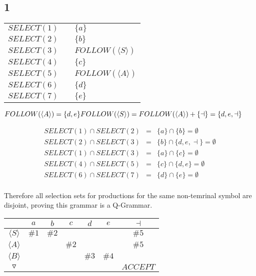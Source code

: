 \documentclass[a4paper,12pt]{article}
\newcommand{\nonterminal}[1]{\langle #1 \rangle}
\begin{document}
\subsection*{1}

\begin{tabular}{lcl}
$SELECT(1)$	&	\hspace{10mm}	&	$\{a\}$	\\
$SELECT(2)$	&						&	$\{b\}$	\\
$SELECT(3)$	&						&	$FOLLOW(\nonterminal{S})$	\\
$SELECT(4)$	&						&	$\{c\}$	\\
$SELECT(5)$	&						&	$FOLLOW(\nonterminal{A})$	\\
$SELECT(6)$	&						&	$\{d\}$	\\
$SELECT(7)$	&						&	$\{e\}$	\\
\end{tabular}

$FOLLOW(\nonterminal{A}) = \{d,e\} \\
FOLLOW(\nonterminal{S}) = FOLLOW(\nonterminal{A}) + \{\dashv\} =
\{d,e,\dashv\}$

\begin{eqnarray*}
SELECT(1) \cap	SELECT(2)	&	=	&	\{a\} \cap \{b\}	= \emptyset	\\ 
SELECT(2) \cap	SELECT(3)	&	=	&	\{b\} \cap \{d,e,\dashv\}	= \emptyset	\\ 
SELECT(1) \cap	SELECT(3)	&	=	&	\{a\} \cap \{c\}	= \emptyset	\\ 
SELECT(4) \cap	SELECT(5)	&	=	&	\{c\} \cap \{d,e\}	= \emptyset	\\ 
SELECT(6) \cap	SELECT(7)	&	=	&	\{d\} \cap \{e\}	= \emptyset	\\ 
\end{eqnarray*}

Therefore all selection sets for productions for the same non-temrinal
symbol are disjoint, proving this grammar is a Q-Grammar.

\begin{tabular}{|c|c|c|c|c|c|c|}
\hline
						&	$a$	&	$b$	&	$c$	&	$d$	&	$e$	&	$\dashv$ \\
\hline
$\nonterminal{S}$	&	$\#1$	&	$\#2$	&			&			&			&	$\#5$		\\
\hline
$\nonterminal{A}$	&			&			&	$\#2$	&			&			&	$\#5$		\\
\hline
$\nonterminal{B}$	&			&			&			&	$\#3$	&	$\#4$	&				\\
\hline
$\triangledown$	&			&			&			&			&			& $ACCEPT$	\\
\hline
\end{tabular}
\end{document}
